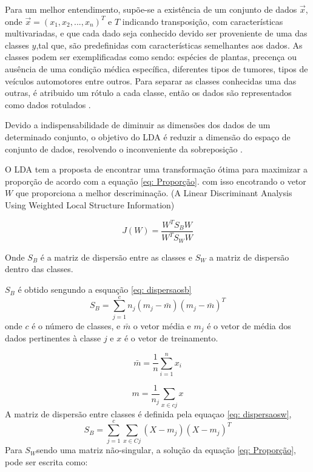 Para um melhor entendimento, supõe-se a existência de um conjunto de dados $\vec x$, onde $\vec x = (x_1, x_2,...,x_n)^T$
e $T$ indicando transposição, com características multivariadas, e que cada dado
seja conhecido devido ser proveniente de uma das  classes $y$,tal que, são predefinidas com características
semelhantes aos dados. As classes podem ser exemplificadas como sendo: espécies de plantas,
precença ou ausência de uma condição médica específica, diferentes tipos de tumores, tipos de veículos automotores
entre outros. Para separar as classes conhecidas uma das outras, é atribuido um rótulo a cada classe, então os dados são
representados como dados rotulados \cite{izenmanLDA}.


Devido a indispensabilidade de diminuir as dimensões dos dados de um determinado conjunto, o objetivo do LDA
é reduzir a dimensão do espaço de conjunto de dados, resolvendo o inconveniente da sobreposição \cite{SinghLDA}.

O LDA tem a proposta de encontrar uma transformação ótima para maximizar a proporção de acordo com a equação \ref{eq: Proporção}.
com isso encotrando o vetor $W$ que proporciona a melhor descriminação. (A Linear Discriminant Analysis Using
Weighted Local Structure Information)

\begin{equation}
	\label{eq: Proporção}
	J(W) = \frac { W^T S_B W}{W^T S_W W}
\end{equation}

Onde $S_B$ é a matriz de dispersão entre as classes e $ S_W$ a matriz de dispersão dentro das classes. 

$S_B$ é obtido sengundo a esquação \ref{eq: dispersaosb} 
\begin{equation}
	\label{eq: dispersaosb}
	 S_B = \sum_{j=1}^{c} n_j(m_j - \bar m)(m_j -\bar m)^T 
\end{equation}
onde $c$ é o número de classes, e $\bar m$ o vetor média e  $m_j$ é o vetor de média dos dados 
pertinentes à classe $j$ e $x$ é o vetor de treinamento.

\begin{equation}
	\label{eq: media}
	\bar m = \frac{1}{n}\sum_{i=1}^{n} {x_i}
\end{equation}

\begin{equation}
	\label{eq: media2}
	m = \frac{1}{n_j}\sum_{x \in c j}^{} x
\end{equation}
A matriz de dispersão entre classes é definida pela equaçao \ref{eq: dispersaosw},
\begin{equation}
	\label{eq: dispersaosw}
	 S_B = \sum_{j=1}^{c} \sum_{x \in C j}{} (X - m_j)(X - m_j)^T 
\end{equation}
Para $S_W$sendo uma matriz não-singular, a solução da equação 
\ref{eq: Proporção}, pode ser escrita como: 

